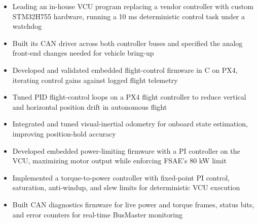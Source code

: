 \documentclass[10pt,letterpaper]{article}
\begin{document}
\bodyfont

\resumeheader
\educationsection




\orgline{\spartanracing}
\begin{itemize}
  \item Leading an in-house VCU program replacing a vendor controller with custom STM32H755 hardware, running a 10 ms deterministic control task under a watchdog
  \item Built its CAN driver across both controller buses and specified the analog front-end changes needed for vehicle bring-up
\end{itemize}

\entryspace

\begin{itemize}
  \item Developed and validated embedded flight-control firmware in C on PX4, iterating control gains against logged flight telemetry
  \item Tuned PID flight-control loops on a PX4 flight controller to reduce vertical and horizontal position drift in autonomous flight
  \item Integrated and tuned visual-inertial odometry for onboard state estimation, improving position-hold accuracy
\end{itemize}

\entryspace

\orgline{\spartanracing}
\begin{itemize}
  \item Developed embedded power-limiting firmware with a PI controller on the VCU, maximizing motor output while enforcing FSAE's 80 kW limit
  \item Implemented a torque-to-power controller with fixed-point PI control, saturation, anti-windup, and slew limits for deterministic VCU execution
  \item Built CAN diagnostics firmware for live power and torque frames, status bits, and error counters for real-time BusMaster monitoring
\end{itemize}
\end{document}
